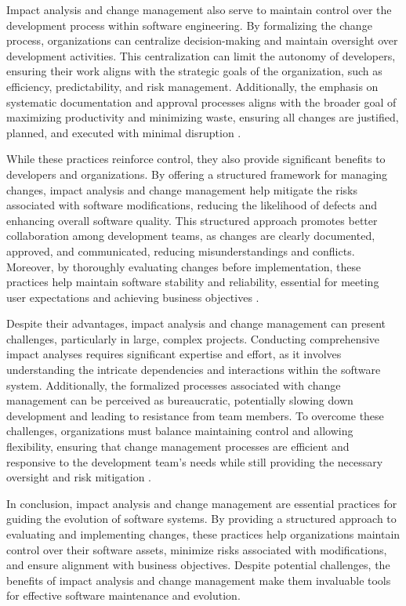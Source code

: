\begin{refsection}
Impact analysis and change management also serve to maintain control over the development process within software engineering. By formalizing the change process, organizations can centralize decision-making and maintain oversight over development activities. This centralization can limit the autonomy of developers, ensuring their work aligns with the strategic goals of the organization, such as efficiency, predictability, and risk management. Additionally, the emphasis on systematic documentation and approval processes aligns with the broader goal of maximizing productivity and minimizing waste, ensuring all changes are justified, planned, and executed with minimal disruption \cite[pp.~47-49]{hunt2021pragmatic}.

While these practices reinforce control, they also provide significant benefits to developers and organizations. By offering a structured framework for managing changes, impact analysis and change management help mitigate the risks associated with software modifications, reducing the likelihood of defects and enhancing overall software quality. This structured approach promotes better collaboration among development teams, as changes are clearly documented, approved, and communicated, reducing misunderstandings and conflicts. Moreover, by thoroughly evaluating changes before implementation, these practices help maintain software stability and reliability, essential for meeting user expectations and achieving business objectives \cite[pp.~154-156]{pressman2019software}.

Despite their advantages, impact analysis and change management can present challenges, particularly in large, complex projects. Conducting comprehensive impact analyses requires significant expertise and effort, as it involves understanding the intricate dependencies and interactions within the software system. Additionally, the formalized processes associated with change management can be perceived as bureaucratic, potentially slowing down development and leading to resistance from team members. To overcome these challenges, organizations must balance maintaining control and allowing flexibility, ensuring that change management processes are efficient and responsive to the development team's needs while still providing the necessary oversight and risk mitigation \cite[pp.~47-49]{hunt2021pragmatic}.

In conclusion, impact analysis and change management are essential practices for guiding the evolution of software systems. By providing a structured approach to evaluating and implementing changes, these practices help organizations maintain control over their software assets, minimize risks associated with modifications, and ensure alignment with business objectives. Despite potential challenges, the benefits of impact analysis and change management make them invaluable tools for effective software maintenance and evolution.


\end{refsection}
